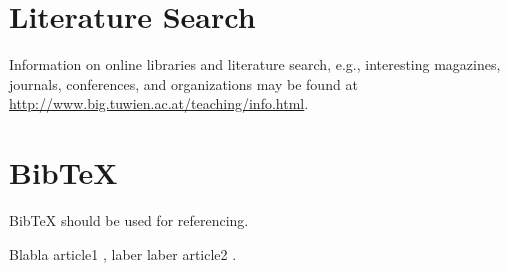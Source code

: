 \section{Literature Search}

Information on online libraries and literature search, e.g., interesting magazines, journals, conferences, and organizations may be found at \url{http://www.big.tuwien.ac.at/teaching/info.html}.

\section{BibTeX}

BibTeX should be used for referencing.

Blabla article1 \cite{hetzl2012towards}, laber laber article2 \cite{hetzl2014article}.